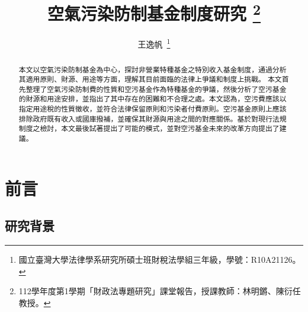 \documentclass[12pt,a4paper]{article}
\author{王逸帆\,
\thanks{國立臺灣大學法律學系研究所碩士班財稅法學組三年級，學號：R10A21126。}
\vspace{-60em}
}
\date{}
\title{空氣污染防制基金制度研究
\thanks{
  112學年度第1學期「財政法專題研究」課堂報告，授課教師：林明鏘、陳衍任教授。}}
\begin{document}
\maketitle
\makeatother

\vspace{1pt}

\begin{abstract}
\setlength{\parindent}{2em}
\noindent
\hspace*{0.9\parindent}


本文以空氣污染防制基金為中心，探討非營業特種基金之特別收入基金制度，通過分析其適用原則、財源、用途等方面，理解其目前面臨的法律上爭議和制度上挑戰。
本文首先整理了空氣污染防制費的性質和空污基金作為特種基金的爭議，然後分析了空污基金的財源和用途安排，並指出了其中存在的困難和不合理之處。本文認為，空污費應該以指定用途稅的性質徵收，並符合法律保留原則和污染者付費原則。空污基金原則上應該排除政府既有收入或國庫撥補，並確保其財源與用途之間的對應關係。基於對現行法規制度之檢討，本文最後試著提出了可能的模式，並對空污基金未來的改革方向提出了建議。

   \end{abstract}



\thispagestyle{empty} %
\clearpage

\vspace{-2cm}
\tableofcontents 

\listoftables
\listoffigures


\thispagestyle{empty} %
\clearpage

\restoregeometry

\setcounter{page}{1} %

\section{前言}
\subsection{研究背景}
\end{document}
